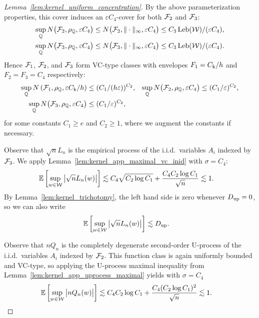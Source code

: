 \begin{proof}[Lemma~\ref{lem:kernel_uniform_concentration}]
  By the above parameterization properties,
  this cover induces an
  $\varepsilon C_4$-cover for both $\mathcal{F}_2$ and $\mathcal{F}_3$:
  \begin{align*}
    \sup_{\mathbb{Q}}
    N\big(\mathcal{F}_2, \rho_{\mathbb{Q}}, \varepsilon C_4 \big)
    &\leq
    N\big(\mathcal{F}_2, \|\cdot\|_\infty, \varepsilon C_4 \big)
    \leq
    C_3 \operatorname{Leb}(\mathcal{W}) / (\varepsilon C_4), \\
    \sup_{\mathbb{Q}}
    N\big(\mathcal{F}_3, \rho_{\mathbb{Q}}, \varepsilon C_4 \big)
    &\leq
    N\big(\mathcal{F}_3, \|\cdot\|_\infty, \varepsilon C_4 \big)
    \leq
    C_3 \operatorname{Leb}(\mathcal{W}) / (\varepsilon C_4).
  \end{align*}
  Hence $\mathcal{F}_1$, $\mathcal{F}_2$, and $\mathcal{F}_3$
  form VC-type classes with envelopes
  $F_1 = C_{\mathrm{k}} / h$ and
  $F_2 = F_3 = C_4$ respectively:
  \begin{align*}
    \sup_{\mathbb{Q}}
    N\left(\mathcal{F}_1, \rho_{\mathbb{Q}},
    \varepsilon C_{\mathrm{k}} / h \right)
    &\leq
    (C_1/(h\varepsilon))^{C_2},
    &\sup_{\mathbb{Q}}
    N\big(\mathcal{F}_2, \rho_{\mathbb{Q}}, \varepsilon C_4 \big)
    &\leq
    (C_1/\varepsilon)^{C_2}, \\
    \sup_{\mathbb{Q}}
    N\big(\mathcal{F}_3, \rho_{\mathbb{Q}}, \varepsilon C_4 \big)
    &\leq
    (C_1/\varepsilon)^{C_2},
  \end{align*}
  for some constants $C_1 \geq e$ and $C_2 \geq 1$,
  where we augment the constants if necessary.


  Observe that
  $\sqrt{n}L_n$
  is the empirical process of the i.i.d.\ variables $A_i$
  indexed by $\mathcal{F}_3$.
  We apply Lemma~\ref{lem:kernel_app_maximal_vc_inid}
  with $\sigma = C_4$:
  \begin{align*}
    \mathbb{E} \left[
      \sup_{w \in \mathcal{W}}
      \big| \sqrt{n} L_
      n(w) \big|
    \right]
    &\lesssim
    C_4
    \sqrt{C_2 \log C_1}
    +
    \frac{C_4 C_2 \log C_1}
    {\sqrt{n}}
    \lesssim 1.
  \end{align*}
  By Lemma~\ref{lem:kernel_trichotomy},
  the left hand side is zero whenever
  $D_{\textup{up}} = 0$,
  so we can also write
  \begin{align*}
    \mathbb{E} \left[
      \sup_{w \in \mathcal{W}}
      \big| \sqrt{n} L_n(w) \big|
    \right]
    &\lesssim
    D_{\textup{up}}.
  \end{align*}


  Observe that $n Q_n$
  is the completely degenerate second-order U-process
  of the i.i.d.\ variables $A_i$
  indexed by $\mathcal{F}_2$.
  This function class is again uniformly bounded and VC-type,
  so applying the U-process maximal inequality from
  Lemma~\ref{lem:kernel_app_uprocess_maximal}
  yields with $\sigma = C_4$
  \begin{align*}
    \mathbb{E} \left[
      \sup_{w \in \mathcal{W}}
      \big| n Q_n(w) \big|
    \right]
    &\lesssim
    C_4
    C_2 \log C_1
    +
    \frac{C_4 (C_2 \log C_1)^2}
    {\sqrt{n}}
    \lesssim 1.
  \end{align*}


\end{proof}
